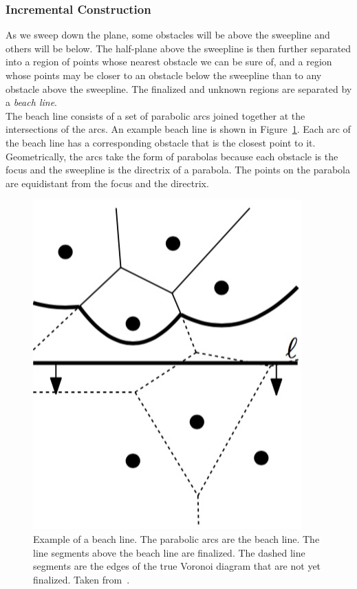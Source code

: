 \documentclass[conference]{IEEEtran}
\begin{document}
\subsubsection{Incremental Construction}
As we sweep down the plane, some obstacles will be above the sweepline and others
will be below. The half-plane above the sweepline is then further separated
into a region of points whose nearest obstacle we can be sure of, and a region
whose points may be closer to an obstacle below the sweepline than to any obstacle
above the sweepline. The finalized and unknown regions are separated by a
\emph{beach line}.\\
\indent The beach line consists of a set of parabolic arcs joined together at
the intersections of the arcs. An example beach line is shown in Figure~\ref{beachline}.
Each arc of the beach line has a corresponding obstacle that is the closest point to
it. Geometrically, the arcs take the form of parabolas because each obstacle is the
focus and the sweepline is the directrix of a parabola. The points on the parabola
are equidistant from the focus and the directrix.

\begin{figure}[tp]
    \includegraphics[width=\columnwidth]{beachline}
    \caption{Example of a beach line. The parabolic arcs are the beach line. The line
    segments above the beach line are finalized. The dashed line segments are the
    edges of the true Voronoi diagram that are not yet finalized. Taken
    from~\cite{compgeometry}.}\label{beachline}
\end{figure}
\end{document}
